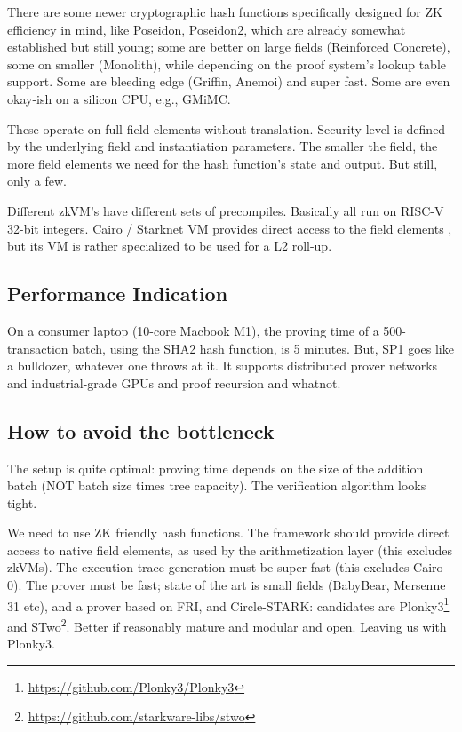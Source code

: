 \documentclass[twocolumn]{article}
\begin{document}
There are some newer cryptographic hash functions specifically designed for ZK efficiency in mind, like Poseidon, Poseidon2, which are already somewhat established but still young; some are better on large fields (Reinforced Concrete), some on smaller (Monolith), while depending on the proof system's lookup table support. Some are bleeding edge (Griffin, Anemoi) and super fast. Some are even okay-ish on a silicon CPU, e.g., GMiMC.

These operate on full field elements without translation. Security level is defined by the underlying field and instantiation parameters. The smaller the field, the more field elements we need for the hash function's state and output. But still, only a few.

Different zkVM's have different sets of precompiles. Basically all run on RISC-V 32-bit integers. Cairo / Starknet VM provides direct access to the field elements , but its VM is rather specialized to be used for a L2 roll-up.


\subsection{Performance Indication}

On a consumer laptop (10-core Macbook M1), the proving time of a 500-transaction batch, using the SHA2 hash function, is 5 minutes. But, SP1 goes like a bulldozer, whatever one throws at it. It supports distributed prover networks and industrial-grade GPUs and proof recursion and whatnot.


\subsection{How to avoid the bottleneck}

The setup is quite optimal: proving time depends on the size of the addition batch (NOT batch size times tree capacity). The verification algorithm looks tight.

We need to use ZK friendly hash functions. The framework should provide direct access to native field elements, as used by the arithmetization layer (this excludes zkVMs). The execution trace generation must be super fast (this excludes Cairo 0). The prover must be fast; state of the art is small fields (BabyBear, Mersenne 31 etc), and a prover based on FRI, and Circle-STARK: candidates are Plonky3\footnote{\url{https://github.com/Plonky3/Plonky3}} and STwo\footnote{\url{https://github.com/starkware-libs/stwo}}. Better if reasonably mature and modular and open. Leaving us with Plonky3.
\end{document}
